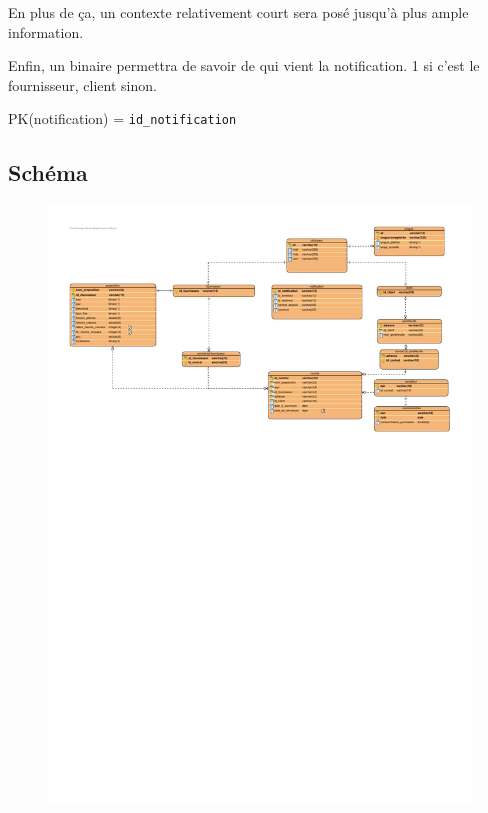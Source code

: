 \begin{flushleft}
En plus de ça, un contexte relativement court sera posé jusqu'à plus ample information.
\end{flushleft}

\begin{flushleft}
Enfin, un binaire permettra de savoir de qui vient la notification. 1 si c'est le fournisseur, client sinon.
\end{flushleft}

\begin{flushleft}
PK(notification) = \texttt{id\_notification}
\end{flushleft}

\newpage

\subsection{Schéma}
\begin{figure}[h]
\includegraphics[scale=0.5]{Base/bdd/img/bdd.pdf}
\end{figure}
